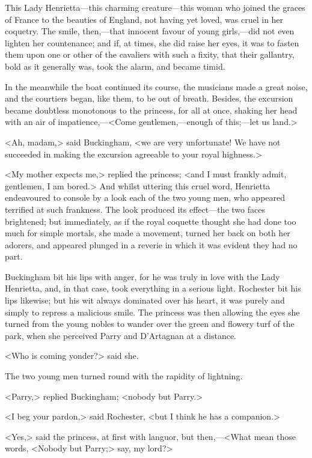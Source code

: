 This Lady Henrietta—this charming creature—this woman who joined the graces of France to the beauties of England, not having yet loved, was cruel in her coquetry. The smile, then,—that innocent favour of young girls,—did not even lighten her countenance; and if, at times, she did raise her eyes, it was to fasten them upon one or other of the cavaliers with such a fixity, that their gallantry, bold as it generally was, took the alarm, and became timid.

In the meanwhile the boat continued its course, the musicians made a great noise, and the courtiers began, like them, to be out of breath. Besides, the excursion became doubtless monotonous to the princess, for all at once, shaking her head with an air of impatience,—<Come gentlemen,—enough of this;—let us land.>

<Ah, madam,> said Buckingham, <we are very unfortunate! We have not succeeded in making the excursion agreeable to your royal highness.>

<My mother expects me,> replied the princess; <and I must frankly admit, gentlemen, I am bored.> And whilst uttering this cruel word, Henrietta endeavoured to console by a look each of the two young men, who appeared terrified at such frankness. The look produced its effect—the two faces brightened; but immediately, as if the royal coquette thought she had done too much for simple mortals, she made a movement, turned her back on both her adorers, and appeared plunged in a reverie in which it was evident they had no part.

Buckingham bit his lips with anger, for he was truly in love with the Lady Henrietta, and, in that case, took everything in a serious light. Rochester bit his lips likewise; but his wit always dominated over his heart, it was purely and simply to repress a malicious smile. The princess was then allowing the eyes she turned from the young nobles to wander over the green and flowery turf of the park, when she perceived Parry and D'Artagnan at a distance.

<Who is coming yonder?> said she.

The two young men turned round with the rapidity of lightning.

<Parry,> replied Buckingham; <nobody but Parry.>

<I beg your pardon,> said Rochester, <but I think he has a companion.>

<Yes,> said the princess, at first with languor, but then,—<What mean those words, <Nobody but Parry;> say, my lord?>

